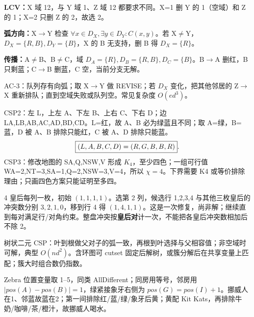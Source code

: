 \label{ex:ac}
\textbf{LCV：}X 域 12，与 Y 域 1、Z 域 12 都要求不同。X=1 删 Y 的 1（空域）和 Z 的 1；X=2 只删 Z 的 2，故选 2。

\textbf{弧方向：}X$\to$Y 检查 $\forall x\in D_X,\exists y\in D_Y:C(x,y)$。若 X$\ne$Y，$D_X=\{R,B\},D_Y=\{B\}$，X 的 B 无支持，删 B 得 $D_X=\{R\}$。

\textbf{传播：}A$\ne$B、B$\ne$C，域 $D_A=\{R\},D_B=\{R,B\},D_C=\{B\}$。B$\to$A 删红，B 只剩蓝；C$\to$B 删蓝，C 空，当前分支无解。

AC-3：队列存有向弧；取 X$\to$Y 做 REVISE；若 $D_X$ 变化，把其他邻居的 Z$\to$X 重新排队；直到空域失败或队列空。常见复杂度 $O(ed^3)$。

CSP2：左 L，上左 A、下左 B、上右 C、下右 D；边 LA,LB,AB,AC,AD,BD,CD。L=红，故 A、B 必为绿蓝且不同；取 A=绿，B=蓝，D 被 A、B 排除只能红，C 被 A、D 排除只能蓝。
\[
\boxed{(L,A,B,C,D)=(R,G,B,B,R)}.
\]
CSP3：修改地图的 SA,Q,NSW,V 形成 $K_4$，至少四色；一组可行值 WA=2,NT=3,SA=1,Q=2,NSW=3,V=4，所以 $\chi=4$。下界需要 K4 或等价排除理由；只画四色方案只能证明至多四。

4 皇后每列一枚，初始 $(1,1,1,1)$。选第 2 列，候选行 1,2,3,4 与其他三枚皇后的冲突数分别 $3,2,1,0$，移到行 4 得 $(1,4,1,1)$。这是一次修复，尚非解；继续直到每对满足行/对角约束。整盘冲突按\textbf{皇后对}计一次，不能把各皇后冲突数相加后不除 2。

树状二元 CSP：叶到根做父对子的弧一致，再根到叶选择与父相容值；非空域时可解，典型 $O(nd^2)$。含环图可 cutset 固定后解树，或簇分解后在共享变量上匹配；簇大时组合数仍指数。

Zebra 位置变量取 1--5，同类 AllDifferent；同房用等号，邻房用 $|pos(A)-pos(B)|=1$，绿紧接象牙右侧为 $pos(G)=pos(I)+1$。挪威人在1、邻蓝故蓝在2；第一间排除红/蓝/绿/象牙后黄；黄配 Kit Kats，再排除牛奶/咖啡/茶/橙汁，故挪威人喝水。
